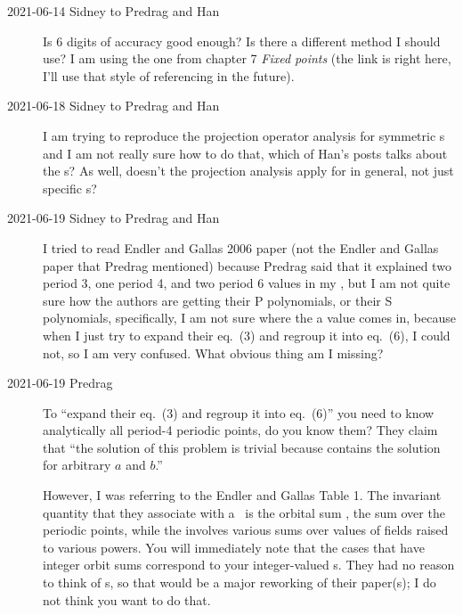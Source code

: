 \begin{description}
\item[2021-06-14 Sidney to Predrag and Han]
Is 6 digits of
accuracy good enough? Is there a different method I should use? I am using
the one from
{chapter 7} {\em Fixed points}
(the link is right here, I'll use that style of referencing in the future).

\item[2021-06-18 Sidney to Predrag and Han]
I am trying to reproduce the projection operator analysis for 
symmetric {\lattstate}s and I am not really sure how to do that, which of
Han's posts talks about the {\lattstate}s? As well, doesn't the projection
analysis apply for \Dn{\cl{}} in general, not just specific {\lattstate}s?


\item[2021-06-19 Sidney to Predrag and Han]
I tried to read Endler and Gallas
{2006 paper}
(not the Endler and Gallas paper that Predrag mentioned)
because Predrag said that it explained two period 3, one period 4, and two
period 6 values in my , but I
am not quite sure how the authors are getting their P polynomials, or their S
polynomials, specifically, I am not sure where the a value comes in, because
when I just try to expand their eq.~(3) and regroup it into eq.~(6), I could
not, so I am very confused. What obvious thing am I missing?

\item[2021-06-19 Predrag]
To ``expand their eq.~(3) and regroup it into eq.~(6)'' you need to know
analytically all period-4 periodic points, do you know them? They claim that
``the solution of this problem is trivial because  contains
the solution for arbitrary $a$ and $b$.''

However, I was referring to the Endler and Gallas Table 1.
The invariant quantity that
they associate with a \po\ is the orbital sum , the sum over
the periodic points, while the {\HillDet} involves various sums over values
of fields raised to various powers.
You will immediately note that the cases that have integer orbit sums
correspond to your integer-valued {\HillDet}s.
They had no reason to think of
{\HillDet}s, so that would be a major reworking of their paper(s); I do not
think you want to do that.


\end{description}
